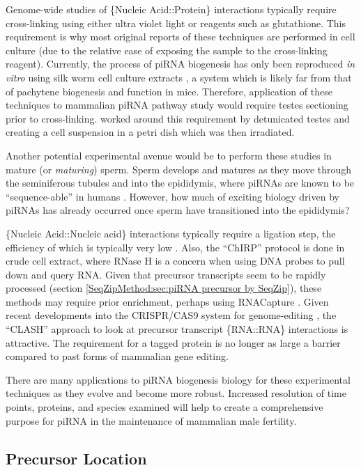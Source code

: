     Genome-wide studies of \{Nucleic Acid::Protein\} interactions typically require cross-linking \citep{Chodosh2001} using either ultra violet light or reagents such as glutathione. This requirement is why most original reports of these techniques are performed in cell culture (due to the relative ease of exposing the sample to the cross-linking reagent). Currently, the process of piRNA biogenesis has only been reproduced \textit{in vitro} using silk worm cell culture extracts \citep{Kawaoka2009,Kawaoka2011}, a system which is likely far from that of pachytene biogenesis and function in mice. Therefore, application of these techniques to mammalian piRNA pathway study would require testes sectioning prior to cross-linking. \citep{Vourekas2012} worked around this requirement by detunicated testes and creating a cell suspension in a petri dish which was then irradiated.

    Another potential experimental avenue would be to perform these studies in mature (or \textit{maturing}) sperm. Sperm develops and matures as they move through the seminiferous tubules and into the epididymis, where piRNAs are known to be ``sequence-able'' in humans \citep{Jones1999,Li2012a}. However, how much of exciting biology driven by piRNAs has already occurred once sperm have transitioned into the epididymis?

    \{Nucleic Acid::Nucleic acid\} interactions typically require a ligation step, the efficiency of which is typically very low \citep{Helwak2014}. Also, the ``ChIRP'' protocol is done in crude cell extract, where RNase H is a concern when using DNA probes to pull down and query RNA. Given that precursor transcripts seem to be rapidly processed (section \ref{SeqZipMethod:sec:piRNA precursor by SeqZip}), these methods may require prior enrichment, perhaps using RNACapture \citep{Mercer2014}. Given recent developments into the CRISPR/CAS9 system for genome-editing \citep{Sander2014}, the ``CLASH'' approach to look at precursor transcript \{RNA::RNA\} interactions is attractive. The requirement for a tagged protein is no longer as large a barrier compared to past forms of mammalian gene editing.

    There are many applications to piRNA biogenesis biology for these experimental techniques as they evolve and become more robust. Increased resolution of time points, proteins, and species examined will help to create a comprehensive purpose for piRNA in the maintenance of mammalian male fertility.

  \subsection{Precursor Location}
    \label{Disc:subsec:Imaging of precursors}

